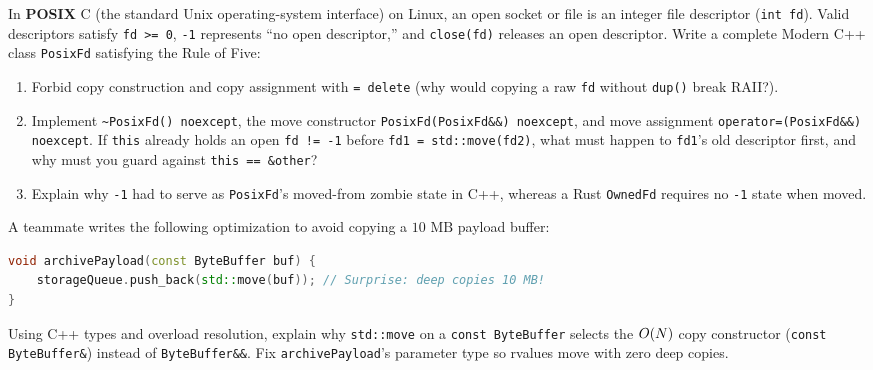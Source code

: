 \begin{exercise}
In \textbf{POSIX} C (the standard Unix operating-system interface) on Linux, an open socket or file is an integer file descriptor (\texttt{int fd}). Valid descriptors satisfy \texttt{fd >= 0}, \texttt{-1} represents ``no open descriptor,'' and \texttt{close(fd)} releases an open descriptor. Write a complete Modern C++ class \texttt{PosixFd} satisfying the Rule of Five:
\begin{enumerate}[label=(\alph*)]
  \item Forbid copy construction and copy assignment with \texttt{= delete} (why would copying a raw \texttt{fd} without \texttt{dup()} break RAII?).
  \item Implement \texttt{\textasciitilde PosixFd() noexcept}, the move constructor \texttt{PosixFd(PosixFd\&\&) noexcept}, and move assignment \texttt{operator=(PosixFd\&\&) noexcept}. If \texttt{this} already holds an open \texttt{fd != -1} before \texttt{fd1 = std::move(fd2)}, what must happen to \texttt{fd1}'s old descriptor first, and why must you guard against \texttt{this == \&other}?
  \item Explain why \texttt{-1} had to serve as \texttt{PosixFd}'s moved-from zombie state in C++, whereas a Rust \texttt{OwnedFd} requires no \texttt{-1} state when moved.
\end{enumerate}
\end{exercise}

\begin{exercise}
A teammate writes the following optimization to avoid copying a $10\text{ MB}$ payload buffer:
\begin{lstlisting}[language=C++]
void archivePayload(const ByteBuffer buf) {
    storageQueue.push_back(std::move(buf)); // Surprise: deep copies 10 MB!
}
\end{lstlisting}
Using C++ types and overload resolution, explain why \texttt{std::move} on a \texttt{const ByteBuffer} selects the $O(N)$ copy constructor (\texttt{const ByteBuffer\&}) instead of \texttt{ByteBuffer\&\&}. Fix \texttt{archivePayload}'s parameter type so rvalues move with zero deep copies.
\end{exercise}

